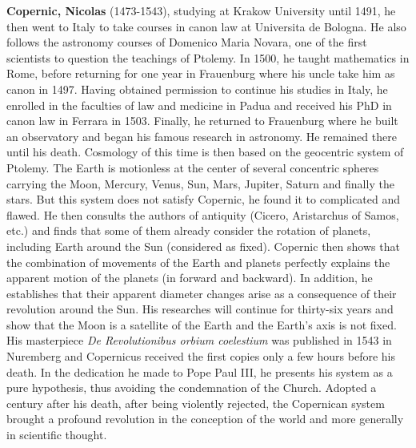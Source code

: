 \textbf{Copernic, Nicolas} (1473-1543), studying at Krakow University until 1491, he then went to Italy to take courses in canon law at Universita de Bologna. He also follows the astronomy courses of Domenico Maria Novara, one of the first scientists to question the teachings of Ptolemy. In 1500, he taught mathematics in Rome, before returning for one year in Frauenburg where his uncle take him as canon in 1497. Having obtained permission to continue his studies in Italy, he enrolled in the faculties of law and medicine in Padua and received his PhD in canon law in Ferrara in 1503. Finally, he returned to Frauenburg where he built an observatory and began his famous research in astronomy. He remained there until his death. Cosmology of this time is then based on the geocentric system of Ptolemy. The Earth is motionless at the center of several concentric spheres carrying the Moon, Mercury, Venus, Sun, Mars, Jupiter, Saturn and finally the stars. But this system does not satisfy Copernic, he found it to complicated and flawed. He then consults the authors of antiquity (Cicero, Aristarchus of Samos, etc.) and finds that some of them already consider the rotation of planets, including Earth around the Sun (considered as fixed). Copernic then shows that the combination of movements of the Earth and planets perfectly explains the apparent motion of the planets (in forward and backward). In addition, he establishes that their apparent diameter changes arise as a consequence of their revolution around the Sun. His researches will continue for thirty-six years and show that the Moon is a satellite of the Earth and the Earth's axis is not fixed. His masterpiece \textit{De Revolutionibus orbium coelestium} was published in 1543 in Nuremberg and Copernicus received the first copies only a few hours before his death. In the dedication he made to Pope Paul III, he presents his system as a pure hypothesis, thus avoiding the condemnation of the Church. Adopted a century after his death, after being violently rejected, the Copernican system brought a profound revolution in the conception of the world and more generally in scientific thought.

